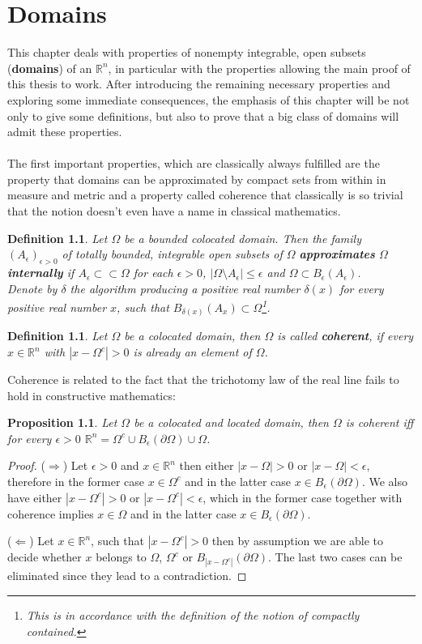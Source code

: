 \documentclass[11pt,a4paper,leqno]{report}
\newtheorem{proposition}{Proposition}[chapter]
\newtheorem{definition}[theorem]{Definition}
\numberwithin{equation}{chapter}
\begin{document}
\chapter{Domains}
This chapter deals with properties of nonempty integrable, open subsets (\textbf{domains}) of an $\mathbb{R}^n$, in particular with the properties allowing the main proof of this thesis to work. After introducing the remaining necessary properties and exploring some immediate consequences, the emphasis of this chapter will be not only to give some definitions, but also to prove that a big class of domains will admit these properties.\\
\\
The first important properties, which are classically always fulfilled are the property that domains can be approximated by compact sets from within in measure and metric and a property called coherence that classically is so trivial that the notion doesn't even have a name in classical mathematics.
\begin{definition}
Let $\Omega$ be a bounded colocated domain. Then the family $(A_\epsilon)_{\epsilon>0}$ of totally bounded, integrable open subsets of $\Omega$ \textbf{approximates} $\Omega$ \textbf{internally} if $A_{\epsilon}\subset\subset\Omega$ for each $\epsilon>0$, $|\Omega\setminus A_\epsilon|\leq\epsilon$ and $\Omega\subset B_\epsilon(A_\epsilon)$. \\Denote by $\delta$ the algorithm producing a positive real number $\delta(x)$ for every positive real number $x$, such that $B_{\delta(x)}(A_x)\subset\Omega$\footnote{This is in accordance with the definition of the notion of compactly contained.}.
\end{definition}
\begin{definition}Let $\Omega$ be a colocated domain, then $\Omega$ is called \textbf{coherent}, if every $x\in\mathbb{R}^n$ with $|x-\Omega^c|>0$ is already an element of $\Omega$.\end{definition}
Coherence is related to the fact that the trichotomy law of the real line fails to hold in constructive mathematics:
\begin{proposition}Let $\Omega$ be a colocated and located domain, then $\Omega$ is coherent iff for every $\epsilon>0$ $\mathbb{R}^n=\Omega^c\cup B_\epsilon(\partial\Omega)\cup\Omega$.
\end{proposition}
\begin{proof}($\Rightarrow$) Let $\epsilon>0$ and $x\in\mathbb{R}^n$ then either $|x-\Omega|>0$ or $|x-\Omega|<\epsilon$, therefore in the former case $x\in\Omega^c$ and in the latter case $x\in B_\epsilon(\partial\Omega)$. We also have either $|x-\Omega^c|>0$ or $|x-\Omega^c|<\epsilon$, which in the former case together with coherence implies $x\in\Omega$ and in the latter case $x\in B_\epsilon(\partial\Omega)$.

($\Leftarrow$) Let $x\in\mathbb{R}^n$, such that $|x-\Omega^c|>0$ then by assumption we are able to decide whether $x$ belongs to $\Omega$, $\Omega^c$ or $B_{|x-\Omega^c|}(\partial\Omega)$. The last two cases can be eliminated since they lead to a contradiction.
\end{proof}
\end{document}
